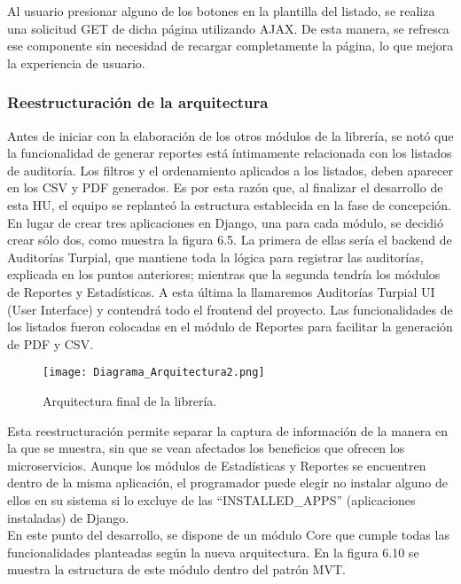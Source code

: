 Al usuario presionar alguno de los botones en la plantilla del listado, se realiza una solicitud GET de dicha página utilizando AJAX. De esta manera, se refresca ese componente sin necesidad de recargar completamente la página, lo que mejora la experiencia de usuario.

\subsubsection{Reestructuración de la arquitectura}

Antes de iniciar con la elaboración de los otros módulos de la librería, se notó que la funcionalidad de generar reportes está íntimamente relacionada con los listados de auditoría. Los filtros y el ordenamiento aplicados a los listados, deben aparecer en los CSV y PDF generados. Es por esta razón que, al finalizar el desarrollo de esta HU, el equipo se replanteó la estructura establecida en la fase de concepción.\\

En lugar de crear tres aplicaciones en Django, una para cada módulo, se decidió crear sólo dos, como muestra la figura 6.5. La primera de ellas sería el backend de Auditorías Turpial, que mantiene toda la lógica para registrar las auditorías, explicada en los puntos anteriores; mientras que la segunda tendría los módulos de Reportes y Estadísticas. A esta última  la llamaremos Auditorías Turpial UI (User Interface) y contendrá todo el frontend del proyecto. Las funcionalidades de los listados fueron colocadas en el módulo de Reportes para facilitar la generación de PDF y CSV.

\begin{figure}[h]
\centering
\texttt{[image: Diagrama\_Arquitectura2.png]}
\caption{Arquitectura final de la librería.}
\label{fig:figura6.5}
\end{figure}

Esta reestructuración permite separar la captura de información de la manera en la que se muestra, sin que se vean afectados los beneficios que ofrecen los microservicios. Aunque los módulos de Estadísticas y Reportes se encuentren dentro de la misma aplicación, el programador puede elegir no instalar alguno de ellos en su sistema si lo excluye de las “INSTALLED\_APPS” (aplicaciones instaladas) de Django.\\

En este punto del desarrollo, se dispone de un módulo Core que cumple todas las funcionalidades planteadas según la nueva arquitectura. En la figura 6.10 se muestra la estructura de este módulo dentro del patrón MVT.

